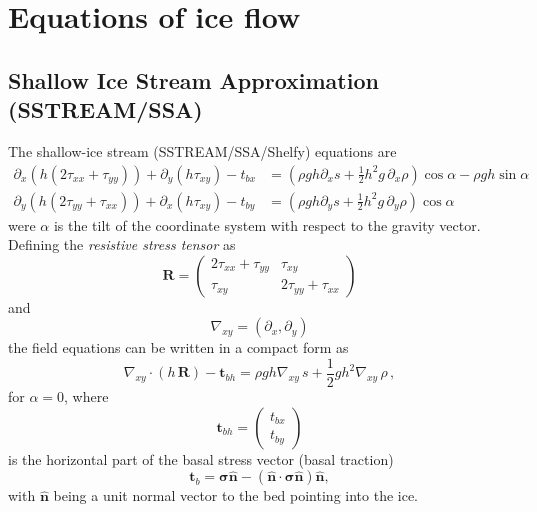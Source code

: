\documentclass[10pt,a4paper]{book}
\newcommand{\p}{\partial}
\newcommand{\tbx}{t_{bx}}
\newcommand{\tby}{t_{by}}
\newcommand{\txx}{\tau_{xx}}
\newcommand{\tyy}{\tau_{yy}}
\newcommand{\txy}{\tau_{xy}}
\newcommand{\normal}{\hat{\bm{n}}}
\begin{document}
\chapter{Equations of ice flow}



\section{Shallow Ice Stream Approximation (SSTREAM/SSA)}

The shallow-ice stream (SSTREAM/SSA/Shelfy) equations are
\begin{align} 
\p_x ( h ( 2 \txx + \tyy)) +\p_y ( h \txy) - \tbx
&=(\rho g h \p_x s +\frac{1}{2} h^2 g  \, \p_x \rho ) \cos \alpha-\rho g h \sin \alpha
\label{eq:stressx}\\
\p_y (  h ( 2 \tyy + \txx)) +\p_x ( h \txy ) - \tby
&=(\rho g h \p_y s  +\frac{1}{2} h^2 g \, \p_y \rho ) \cos \alpha
\label{eq:stressy}
\end{align}
were $\alpha$ is the tilt of the coordinate system with respect to the
gravity vector. Defining the {\em resistive stress tensor} as
\begin{equation}
\bm{R}=\begin{pmatrix} 2 \txx+\tyy & \txy \\ \txy & 2 \tyy + \txx \end{pmatrix}
\label{eq:defSigmah}
\end{equation}
and
\[
\nabla_{xy} = (\p_x , \p_y)
\]
the field equations can be written in a compact form as
\begin{equation}
\nabla_{xy} \cdot (h \, \bm{R}) - \bm{t}_{bh} = \rho g h \nabla_{xy}  \, s  + \frac{1}{2} g h^2 \nabla_{xy} \, \rho \, ,
\label{eq:FEao}
\end{equation}
for $\alpha=0$, where
\[
\bm{t}_{bh}= \left ( \begin{array}{c} \tbx \\ \tby \end{array} \right )
\]
is the horizontal part of the basal stress vector (basal traction) 
\[
\bm{t}_b=\bm{\sigma}
\normal-(\normal \cdot \bm{\sigma} \normal) \normal ,\] 
with $\normal$ being a unit normal vector to the bed pointing into the
ice.
\end{document}
